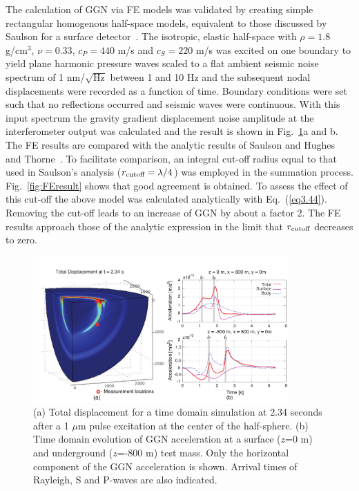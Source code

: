 The calculation of GGN via FE models was validated by creating simple rectangular homogenous half-space models, equivalent to those discussed by Saulson for a surface detector~\cite{GGSaulson}. The isotropic, elastic half-space with $\rho = 1.8$ g/cm$^3$, $\nu = 0.33$, $c_P = 440$ m/s and $c_S = 220$ m/s was excited on one boundary to yield plane harmonic pressure waves scaled to a flat ambient seismic noise spectrum of 1 nm/$\sqrt{\mbox{Hz}}$ between 1 and 10 Hz and the subsequent nodal displacements were recorded as a function of time. Boundary conditions were set such that no reflections occurred and seismic waves were continuous. With this input spectrum the gravity gradient displacement noise amplitude at the interferometer output was calculated and the result is shown in Fig.~\ref{fig:QS2Clay_paper}a and b. The FE results are compared with the analytic results of Saulson and Hughes and Thorne~\cite{GGSaulson}\cite{GGThorne}.
To facilitate comparison, an integral cut-off radius equal to that used in Saulson's analysis ($r_{\mbox{\scriptsize{cutoff}}} = \lambda/4$) was employed in the summation process. Fig.~\ref{fig:FEresult} shows that good agreement is obtained. To assess the effect of this cut-off the above model was calculated analytically with Eq.~(\ref{eq3.44}). Removing the cut-off leads to an increase of GGN by about a factor 2. The FE results approach those of the analytic expression in the limit that $r_{\mbox{\scriptsize{cutoff}}} $ decreases to zero.
\begin{figure}[ht]
	\begin{center}
	\includegraphics[width=0.87\textwidth]{./Sec_SiteInfra/Figures/QS2Clay_paper.pdf}
	\caption{(a) Total displacement for a time domain simulation at 2.34 seconds after a 1 $\mu$m pulse excitation at the center of the half-sphere. (b) Time domain evolution of GGN acceleration at a surface ($z$=0 m) and underground ($z$=-800 m) test mass. Only the horizontal component of the GGN acceleration is shown. Arrival times of Rayleigh, S and P-waves are also indicated.}
		\label{fig:QS2Clay_paper}
	\end{center} 
\end{figure}

